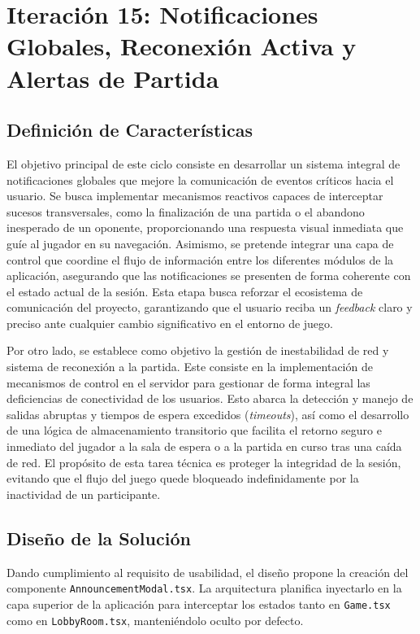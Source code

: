 \chapter[Iteración 15: Notificaciones y Reconexión Activa]{Iteración 15: Notificaciones Globales, Reconexión Activa y Alertas de Partida}

\section{Definición de Características}
El objetivo principal de este ciclo consiste en desarrollar un sistema integral de notificaciones globales que mejore la comunicación de eventos críticos hacia el usuario. Se busca implementar mecanismos reactivos capaces de interceptar sucesos transversales, como la finalización de una partida o el abandono inesperado de un oponente, proporcionando una respuesta visual inmediata que guíe al jugador en su navegación. Asimismo, se pretende integrar una capa de control que coordine el flujo de información entre los diferentes módulos de la aplicación, asegurando que las notificaciones se presenten de forma coherente con el estado actual de la sesión. Esta etapa busca reforzar el ecosistema de comunicación del proyecto, garantizando que el usuario reciba un \textit{feedback} claro y preciso ante cualquier cambio significativo en el entorno de juego.

Por otro lado, se establece como objetivo la gestión de inestabilidad de red y sistema de reconexión a la partida. Este consiste en la implementación de mecanismos de control en el servidor para gestionar de forma integral las deficiencias de conectividad de los usuarios. Esto abarca la detección y manejo de salidas abruptas y tiempos de espera excedidos (\textit{timeouts}), así como el desarrollo de una lógica de almacenamiento transitorio que facilita el retorno seguro e inmediato del jugador a la sala de espera o a la partida en curso tras una caída de red. El propósito de esta tarea técnica es proteger la integridad de la sesión, evitando que el flujo del juego quede bloqueado indefinidamente por la inactividad de un participante.

\section{Diseño de la Solución}
Dando cumplimiento al requisito de usabilidad, el diseño propone la creación del componente \texttt{AnnouncementModal.tsx}. La arquitectura planifica inyectarlo en la capa superior de la aplicación para interceptar los estados tanto en \texttt{Game.tsx} como en \texttt{LobbyRoom.tsx}, manteniéndolo oculto por defecto.

